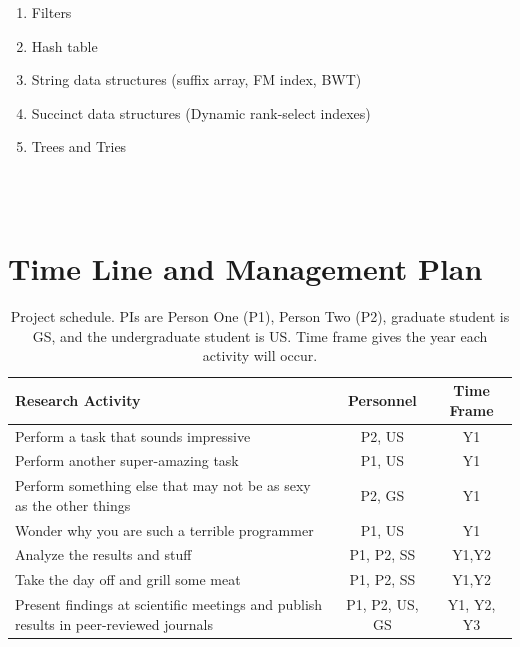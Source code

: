 \begin{enumerate}[noitemsep, leftmargin=*]
  \item Filters
  \item Hash table
  \item String data structures (suffix array, FM index, BWT)
  \item Succinct data structures (Dynamic rank-select indexes)
  \item Trees and Tries
\end{enumerate}



\\
\\






\section{Time Line and Management Plan}

\begin{table}[H]
\label{table1}
\renewcommand{\arraystretch}{0}
\caption{Project schedule.  PIs are Person One (P1), Person Two (P2), graduate student is GS, and the undergraduate student is US\@. Time frame gives the year each activity will occur.}
\scriptsize
\begin{tabularx}{\textwidth}{Y c c }
\hline
\hline
\textbf{Research Activity} & \textbf{Personnel} & \textbf{Time Frame}\\
\hline
Perform a task that sounds impressive & P2, US & Y1 \T\\
Perform another super-amazing task & P1, US & Y1 \T\\
Perform something else that may not be as sexy as the other things & P2, GS & Y1 \T\\
Wonder why you are such a terrible programmer & P1, US & Y1 \T\\
Analyze the results and stuff & P1, P2, SS & Y1,Y2 \T\\
Take the day off and grill some meat & P1, P2, SS & Y1,Y2 \T\\
Present findings at scientific meetings and publish results in peer-reviewed journals & P1, P2, US, GS & Y1, Y2, Y3\T\B\\
\hline
\hline
\end{tabularx}
\end{table}

